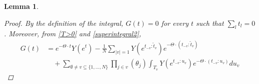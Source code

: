 \documentclass[english, a4paper, 12pt,reqno]{amsart}
\newtheorem{lemma}[defi]{Lemma}
\begin{document}
\begin{lemma}
\begin{proof}
%
By the definition of the integral,  $G(t) = 0$ for every $t$ such that $\sum_l t_l=0$. Moreover, from \eqref{T>0} and \eqref{superintegral2},
\begin{equation}
\label{t>0}
\begin{split}
G(t)
&= e^{-\Theta\cdot t} Y(e^t)-\frac{1}{N} \sum_{|v| =1}Y(e^{t_{-v}:\tilde{t}_v})e^{-\Theta\cdot ({t_{-v}:\tilde{t}_v})} \\ &\quad + \sum_{\emptyset\neq v \subseteq \{1,\dots,N\}} \prod_{j\in v}(\theta_j) \int_{T_v} Y(e^{t_{-v}:u_v})e^{-\Theta\cdot ({t_{-v}:u_v})}du_v

\end{split}
\end{equation}
\end{proof}
\end{lemma}
\end{document}
